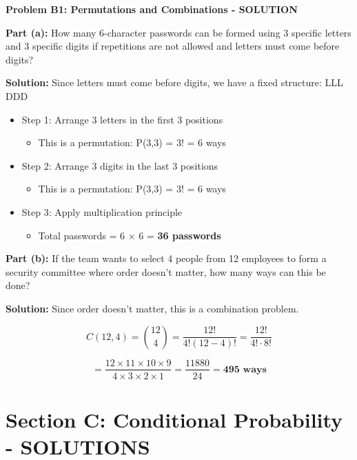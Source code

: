 \documentclass[
  11pt,
]{article}
\providecommand{\tightlist}{%
  \setlength{\itemsep}{0pt}\setlength{\parskip}{0pt}}\usepackage{longtable,booktabs,array}
\begin{document}
\textbf{Problem B1: Permutations and Combinations - SOLUTION}

\textbf{Part (a):} How many 6-character passwords can be formed using 3
specific letters and 3 specific digits if repetitions are not allowed
and letters must come before digits?

\textbf{Solution:} Since letters must come before digits, we have a
fixed structure: LLL DDD

\begin{itemize}
\tightlist
\item
  Step 1: Arrange 3 letters in the first 3 positions

  \begin{itemize}
  \tightlist
  \item
    This is a permutation: P(3,3) = 3! = 6 ways
  \end{itemize}
\item
  Step 2: Arrange 3 digits in the last 3 positions

  \begin{itemize}
  \tightlist
  \item
    This is a permutation: P(3,3) = 3! = 6 ways
  \end{itemize}
\item
  Step 3: Apply multiplication principle

  \begin{itemize}
  \tightlist
  \item
    Total passwords = 6 × 6 = \textbf{36 passwords}
  \end{itemize}
\end{itemize}

\textbf{Part (b):} If the team wants to select 4 people from 12
employees to form a security committee where order doesn't matter, how
many ways can this be done?

\textbf{Solution:} Since order doesn't matter, this is a combination
problem.

\[C(12,4) = \binom{12}{4} = \frac{12!}{4!(12-4)!} = \frac{12!}{4! \cdot 8!}\]

\[= \frac{12 \times 11 \times 10 \times 9}{4 \times 3 \times 2 \times 1} = \frac{11880}{24} = \textbf{495 ways}\]

\section{Section C: Conditional Probability -
SOLUTIONS}\label{section-c-conditional-probability---solutions}
\end{document}
